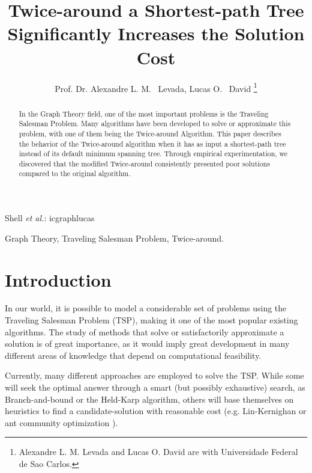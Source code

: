 \documentclass[journal]{IEEEtran}
\begin{document}
\title{Twice-around a Shortest-path Tree Significantly Increases the Solution Cost}

\author{Prof. Dr. Alexandre L. M. ~Levada,
	Lucas O. ~David
\thanks{Alexandre L. M. Levada and Lucas O. David are with Universidade Federal de Sao Carlos.}%
}

\markboth{\today}%
{Shell \MakeLowercase{\textit{et al.}}: icgraphlucas}

\maketitle

\begin{abstract}

In the Graph Theory field, one of the most important problems is the Traveling Salesman Problem. Many algorithms have been developed to solve or approximate this problem, with one of them being the Twice-around Algorithm. This paper describes the behavior of the Twice-around algorithm when it has as input a shortest-path tree instead of its default minimum spanning tree. Through empirical experimentation, we discovered that the modified Twice-around consistently presented poor solutions compared to the original algorithm.

\end{abstract}

\begin{IEEEkeywords}
	Graph Theory, Traveling Salesman Problem, Twice-around.
\end{IEEEkeywords}

\section{Introduction}

In our world, it is possible to model a considerable set of problems using the Traveling Salesman Problem (TSP), making it one of the most popular existing algorithms. The study of methods that solve or satisfactorily approximate a solution is of great importance, as it would imply great development in many different areas of knowledge that depend on computational feasibility.

Currently, many different approaches are employed to solve the TSP. While some will seek the optimal answer through a smart (but possibly exhaustive) search, as Branch-and-bound or the Held-Karp algorithm, others will base themselves on heuristics to find a candidate-solution with reasonable cost (e.g. Lin-Kernighan or ant community optimization \cite{soricone}).
\end{document}
